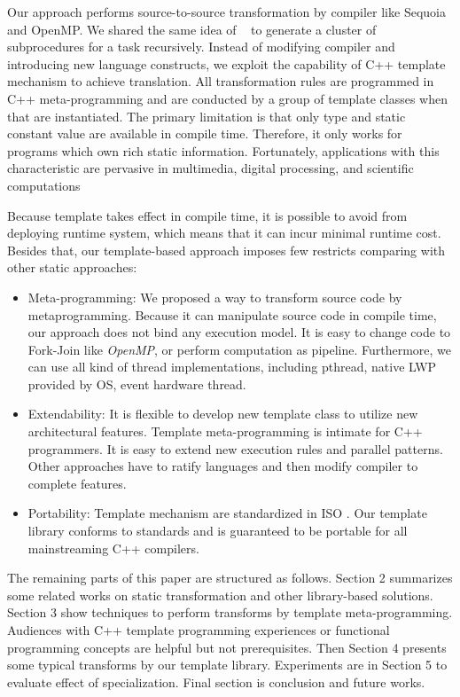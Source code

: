 \documentclass[10pt, conference, compsocconf]{IEEEtran}
\begin{document}
Our approach performs source-to-source transformation by compiler like Sequoia and OpenMP. We shared the same idea of  ~\cite{b1} to generate a cluster of subprocedures for a task recursively. Instead of modifying compiler and introducing new language constructs, we exploit the capability of C++ template mechanism to achieve translation. All transformation rules are programmed in C++ meta-programming \cite{b10} and are conducted by a group of template classes when that are instantiated. The primary limitation is that only type and static constant value are available in compile time. Therefore, it only works for programs which own rich static information. Fortunately, applications with this characteristic are pervasive in multimedia, digital processing, and scientific computations 

Because template takes effect in compile time, it is possible to avoid from deploying runtime system, which means that it can incur minimal runtime cost. Besides that, our template-based approach imposes few restricts comparing with other static approaches:

\begin{itemize}
\item Meta-programming: We proposed a way to transform source code by
metaprogramming. Because it can manipulate source code in compile
time,  our approach does not bind any execution model. It is easy to
change code to Fork-Join like \emph{OpenMP}, or perform computation
as pipeline. Furthermore, we can use all kind of thread
implementations, including pthread, native LWP provided by OS, event hardware thread.

\item Extendability:  It is flexible to develop new template class to utilize new architectural features. Template meta-programming is intimate for C++ programmers. It is easy to extend new execution rules and parallel patterns. Other approaches have to ratify languages and then modify compiler to complete features.

\item Portability: Template mechanism are standardized in ISO \cite{b8, b17}. Our template library conforms to standards and is guaranteed to be portable for all mainstreaming C++ compilers.
\end{itemize}

The remaining parts of this paper are structured as follows. Section 2 summarizes some related works on static transformation and other library-based solutions. Section 3 show techniques to perform transforms by template meta-programming. Audiences with C++ template programming experiences or functional programming concepts are helpful but not prerequisites. Then Section 4 presents some typical transforms by our template library. Experiments are in Section 5 to evaluate effect of specialization. Final section is conclusion and future works.
\end{document}
